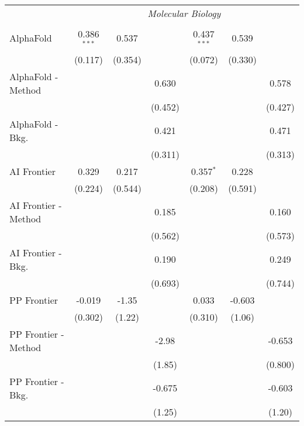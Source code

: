 \begin{tabular}{lcccccc}
 & \multicolumn{6}{c}{\textit{Molecular Biology}} \\ \\
   AlphaFold            & 0.386$^{***}$ & 0.537   &         & 0.437$^{***}$ & 0.539   &   \\   
                        & (0.117)       & (0.354) &         & (0.072)       & (0.330) &   \\   
   AlphaFold - Method   &               &         & 0.630   &               &         & 0.578\\   
                        &               &         & (0.452) &               &         & (0.427)\\   
   AlphaFold - Bkg.     &               &         & 0.421   &               &         & 0.471\\   
                        &               &         & (0.311) &               &         & (0.313)\\   
   AI Frontier          & 0.329         & 0.217   &         & 0.357$^{*}$   & 0.228   &   \\   
                        & (0.224)       & (0.544) &         & (0.208)       & (0.591) &   \\   
   AI Frontier - Method &               &         & 0.185   &               &         & 0.160\\   
                        &               &         & (0.562) &               &         & (0.573)\\   
   AI Frontier - Bkg.   &               &         & 0.190   &               &         & 0.249\\   
                        &               &         & (0.693) &               &         & (0.744)\\   
   PP Frontier          & -0.019        & -1.35   &         & 0.033         & -0.603  &   \\   
                        & (0.302)       & (1.22)  &         & (0.310)       & (1.06)  &   \\   
   PP Frontier - Method &               &         & -2.98   &               &         & -0.653\\   
                        &               &         & (1.85)  &               &         & (0.800)\\   
   PP Frontier - Bkg.   &               &         & -0.675  &               &         & -0.603\\   
                        &               &         & (1.25)  &               &         & (1.20)\\   

\end{tabular}
